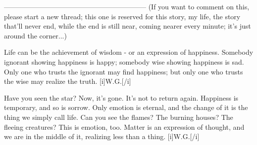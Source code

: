--------------------------------------------------------------
(If you want to comment on this, please start a new thread; this one is reserved for this story, my life, the story that'll never end, while the end is still near, coming nearer every minute; it's just around the corner...)

Life can be the achievement of wisdom - 
or an expression of happiness. 
Somebody ignorant showing happiness is happy; 
somebody wise showing happiness is sad. 
Only one who trusts the ignorant may find happiness; 
but only one who trusts the wise may realize the truth. 
[i]W.G.[/i]

Have you seen the star? 
Now, it's gone. 
It's not to return again. 
Happiness is temporary, 
and so is sorrow. 
Only emotion is eternal, 
and the change of it is the thing 
we simply call life. 
Can you see the flames? 
The burning houses? 
The fleeing creatures? 
This is emotion, too. 
Matter is an expression of thought, 
and we are in the middle of it, 
realizing less than a thing. 
[i]W.G.[/i]
